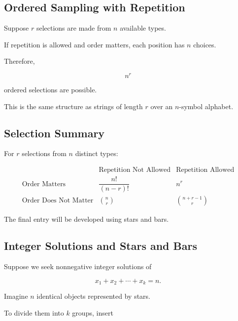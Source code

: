 \subsection{Ordered Sampling with Repetition}
\label{subsec:ordered-sampling-repetition}

Suppose \(r\) selections are made from \(n\) available types.

If repetition is allowed and order matters, each position has \(n\)
choices.

Therefore,

\[
\boxed{
n^r
}
\]

ordered selections are possible.

This is the same structure as strings of length \(r\) over an
\(n\)-symbol alphabet.

\subsection{Selection Summary}
\label{subsec:selection-summary}

For \(r\) selections from \(n\) distinct types:

\[
\boxed{
\begin{array}{c|c|c}
&\text{Repetition Not Allowed}
&\text{Repetition Allowed}\\
\hline
\text{Order Matters}
&
\dfrac{n!}{(n-r)!}
&
n^r
\\[3mm]
\text{Order Does Not Matter}
&
\binom{n}{r}
&
\binom{n+r-1}{r}
\end{array}
}
\]

The final entry will be developed using stars and bars.

\subsection{Integer Solutions and Stars and Bars}
\label{subsec:stars-and-bars}

Suppose we seek nonnegative integer solutions of

\[
x_1+x_2+\cdots+x_k=n.
\]

Imagine \(n\) identical objects represented by stars.

To divide them into \(k\) groups, insert

